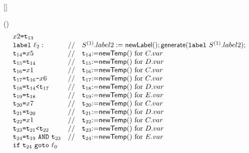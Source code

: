 \documentclass[dvipdfmx,a4j]{jarticle}
\newcounter{coffee}
\newcounter{bean}
\newcommand{\tteq}{\texttt{=}}
\newcommand{\ttlt}{\texttt{<}}
\newcommand{\ttsb}{\texttt{-}}
\newcommand{\tmpv}[1]{\texttt{t}_{#1}}
\begin{document}
\begin{list}{[]}{}
\begin{list}{()}{}
\[\begin{array}{lll}
x2 \tteq \tmpv{13}\\
{\tt label}\ \ell_2 : & // & S^{(1)}.label2:=\mathsf{newLabel}(); \mathsf{generate}({\tt label}\ S^{(1)}.label2);\\
\tmpv{14} \tteq x5 & // & \tmpv{14}{\rm :=}\mathsf{newTemp}()\ \mbox{for $C.var$}\\
\tmpv{15} \tteq \tmpv{14} & // & \tmpv{15}{\rm :=}\mathsf{newTemp}()\ \mbox{for $D.var$}\\
\tmpv{16} \tteq x1 & // & \tmpv{16}{\rm :=}\mathsf{newTemp}()\ \mbox{for $C.var$}\\
\tmpv{17} \tteq \tmpv{16}\ttsb x6 & // & \tmpv{17}{\rm :=}\mathsf{newTemp}()\ \mbox{for $C.var$}\\
\tmpv{18} \tteq \tmpv{14}\ttlt\tmpv{17} & // & \tmpv{18}{\rm :=}\mathsf{newTemp}()\ \mbox{for $D.var$}\\
\tmpv{19} \tteq \tmpv{18} & // & \tmpv{19}{\rm :=}\mathsf{newTemp}()\ \mbox{for $E.var$}\\
\tmpv{20} \tteq x7 & // & \tmpv{20}{\rm :=}\mathsf{newTemp}()\ \mbox{for $C.var$}\\
\tmpv{21} \tteq \tmpv{20} & // & \tmpv{21}{\rm :=}\mathsf{newTemp}()\ \mbox{for $D.var$}\\
\tmpv{22} \tteq x1 & // & \tmpv{22}{\rm :=}\mathsf{newTemp}()\ \mbox{for $C.var$}\\
\tmpv{23} \tteq \tmpv{21}\ttlt\tmpv{22} & // & \tmpv{23}{\rm :=}\mathsf{newTemp}()\ \mbox{for $D.var$}\\
\tmpv{24} \tteq \tmpv{19}\ \texttt{AND}\ \tmpv{23} & // & \tmpv{24}{\rm :=}\mathsf{newTemp}()\ \mbox{for $E.var$}\\
{\tt if}\ \tmpv{24}\ {\tt goto}\ \ell_0\\
  \end{array}\]
\end{list}

\end{list}
\end{document}
